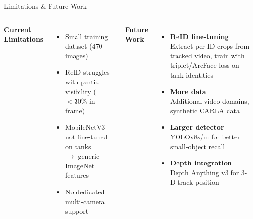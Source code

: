 \documentclass[aspectratio=169]{beamer}
\begin{document}
\begin{frame}{Limitations \& Future Work}
\begin{columns}[T]
\textbf{Current Limitations}
\begin{itemize}
  \item Small training dataset (470 images)
  \item ReID struggles with partial visibility ($< 30\%$ in frame)
  \item MobileNetV3 not fine-tuned on tanks\\
        $\rightarrow$ generic ImageNet features
  \item No dedicated multi-camera support
\end{itemize}

\textbf{Future Work}
\begin{itemize}
  \item \textbf{ReID fine-tuning} \\
        \small Extract per-ID crops from tracked video,
        train with triplet/ArcFace loss on tank identities
  \item \textbf{More data} \\
        \small Additional video domains, synthetic CARLA data
  \item \textbf{Larger detector} \\
        \small YOLOv8s/m for better small-object recall
  \item \textbf{Depth integration} \\
        \small Depth Anything v3 for 3-D track position
\end{itemize}
\end{columns}
\end{frame}
\end{document}
